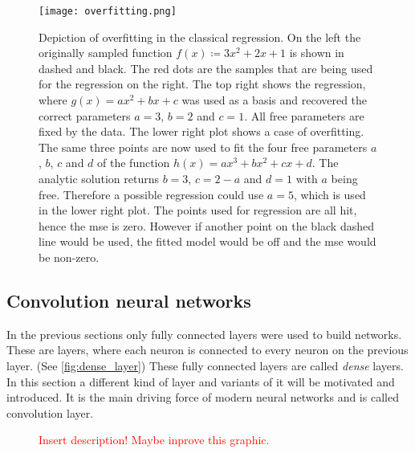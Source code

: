 \begin{figure}
\centering
\texttt{[image: overfitting.png]}
\caption[Overfitting]{Depiction of overfitting in the classical regression. On the left the originally sampled function $f(x)\coloneqq 3x^2 + 2x + 1$ is shown in dashed and black. The red dots are the samples that are being used for the regression on the right. The top right shows the regression, where $g(x)=a x^2 + b x + c$ was used as a basis and recovered the correct parameters $a=3$, $b=2$ and $c=1$. All free parameters are fixed by the data. The lower right plot shows a case of overfitting. The same three points are now used to fit the four free parameters $a$, $b$, $c$ and $d$ of the function $h(x)=a x^3 + b x^2 + c x + d$. The analytic solution returns $b=3$, $c=2-a$ and $d=1$ with $a$ being free. Therefore a possible regression could use $a=5$, which is used in the lower right plot. The points used for regression are all hit, hence the \gls{mse} is zero. However if another point on the black dashed line would be used, the fitted model would be off and the \gls{mse} would be non-zero.}\label{fig:overfitting}
\end{figure}

\subsection{Convolution neural networks}\label{sec:cnn}
In the previous sections only fully connected layers were used to build networks. These are layers, where each neuron is connected to every neuron on the previous layer. (See \autoref{fig:dense_layer}) These fully connected layers are called \emph{dense} layers. In this section a different kind of layer and variants of it will be motivated and introduced. It is the main driving force of modern neural networks and is called convolution layer.
\begin{figure}
\centering

\caption[Dense layer]{\textcolor{red}{Insert description! Maybe inprove this graphic.}}\label{fig:dense_layer}
\end{figure}

